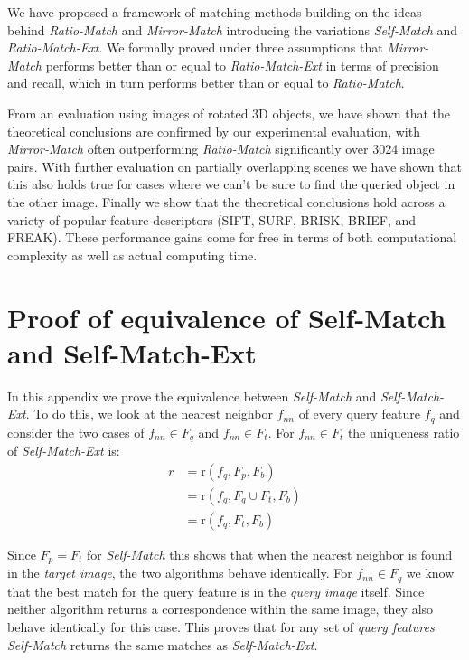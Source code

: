\documentclass[review]{elsarticle}
\begin{document}
We have proposed a framework of matching methods building on the ideas behind \emph{Ratio-Match} and \emph{Mirror-Match} introducing the variations \emph{Self-Match} and \emph{Ratio-Match-Ext}. We formally proved under three assumptions that \emph{Mirror-Match} performs better than or equal to \emph{Ratio-Match-Ext} in terms of precision and recall, which in turn performs better than or equal to \emph{Ratio-Match}.

From an evaluation using images of rotated 3D objects, we have shown that the theoretical conclusions are confirmed by our experimental evaluation, with \emph{Mirror-Match} often outperforming \emph{Ratio-Match} significantly over 3024 image pairs. With further evaluation on partially overlapping scenes we have shown that this also holds true for cases where we can't be sure to find the queried object in the other image. Finally we show that the theoretical conclusions hold across a variety of popular feature descriptors (SIFT, SURF, BRISK, BRIEF, and FREAK). These performance gains come for free in terms of both computational complexity as well as actual computing time.

\appendix

\section{Proof of equivalence of Self-Match and Self-Match-Ext}
\label{A:self}

In this appendix we prove the equivalence between \emph{Self-Match} and \emph{Self-Match-Ext}. To do this, we look at the nearest neighbor $f_{nn}$ of every query feature $f_{q}$ and consider the two cases of $f_{nn} \in F_{q}$ and $f_{nn} \in F_{t}$. For $f_{nn} \in F_{t}$ the uniqueness ratio of \emph{Self-Match-Ext} is:
\begin{align*}
    r &= \text{r}(f_{q}, F_{p}, F_{b}) \\
        &= \text{r}(f_{q}, F_{q} \cup F_{t}, F_{b})\\
        &= \text{r}(f_{q}, F_{t}, F_{b})
\end{align*}

Since $F_{p} = F_{t}$ for \emph{Self-Match} this shows that when the nearest neighbor is found in the \emph{target image}, the two algorithms behave identically. For $f_{nn} \in F_{q}$ we know that the best match for the query feature is in the \emph{query image} itself. Since neither algorithm returns a correspondence within the same image, they also behave identically for this case. This proves that for any set of \emph{query features} \emph{Self-Match} returns the same matches as \emph{Self-Match-Ext}.
\end{document}
